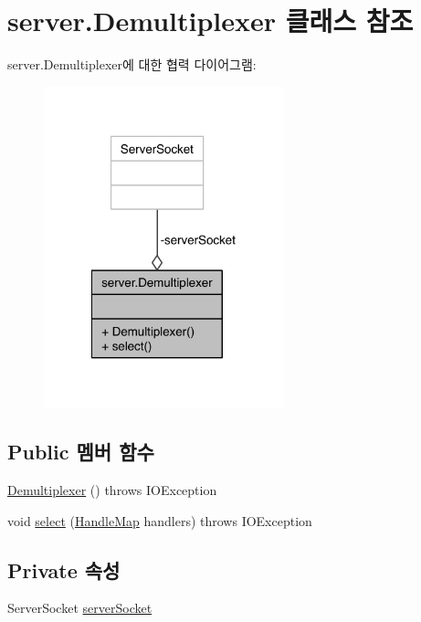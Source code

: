 \hypertarget{classserver_1_1_demultiplexer}{\section{server.\-Demultiplexer 클래스 참조}
\label{classserver_1_1_demultiplexer}
}


server.\-Demultiplexer에 대한 협력 다이어그램\-:
\nopagebreak
\begin{figure}[H]
\begin{center}
\leavevmode
\includegraphics[width=197pt]{classserver_1_1_demultiplexer__coll__graph}
\end{center}
\end{figure}
\subsection*{Public 멤버 함수}
\begin{DoxyCompactItemize}
\item 
\hyperlink{classserver_1_1_demultiplexer_a29f6adc4249c7e6603c84821ba994159}{Demultiplexer} ()  throws I\-O\-Exception 
\item 
void \hyperlink{classserver_1_1_demultiplexer_ac73b7d090155c7ef0112ea3718162a13}{select} (\hyperlink{classserver_1_1_handle_map}{Handle\-Map} handlers)  throws I\-O\-Exception 
\end{DoxyCompactItemize}
\subsection*{Private 속성}
\begin{DoxyCompactItemize}
\item 
Server\-Socket \hyperlink{classserver_1_1_demultiplexer_a45a45c637b717c6d3114e8f3ade5b477}{server\-Socket}
\end{DoxyCompactItemize}


